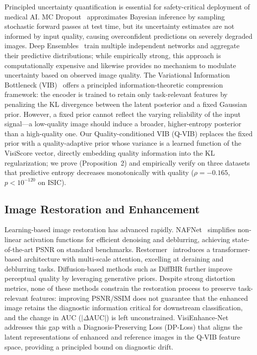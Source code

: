 Principled uncertainty quantification is essential for safety-critical deployment of medical AI.
MC Dropout~\cite{gal2016dropout} approximates Bayesian inference by sampling stochastic forward passes at test time, but its uncertainty estimates are not informed by input quality, causing overconfident predictions on severely degraded images.
Deep Ensembles~\cite{lakshminarayanan2017simple} train multiple independent networks and aggregate their predictive distributions; while empirically strong, this approach is computationally expensive and likewise provides no mechanism to modulate uncertainty based on observed image quality.
The Variational Information Bottleneck (VIB)~\cite{alemi2017deep} offers a principled information-theoretic compression framework: the encoder is trained to retain only task-relevant features by penalizing the KL divergence between the latent posterior and a fixed Gaussian prior.
However, a fixed prior cannot reflect the varying reliability of the input signal—a low-quality image should induce a broader, higher-entropy posterior than a high-quality one.
Our Quality-conditioned VIB (Q-VIB) replaces the fixed prior with a quality-adaptive prior whose variance is a learned function of the VisiScore vector, directly embedding quality information into the KL regularization; we prove (Proposition~2) and empirically verify on three datasets that predictive entropy decreases monotonically with quality ($\rho = -0.165$, $p < 10^{-120}$ on ISIC).

\subsection{Image Restoration and Enhancement}
\label{sec:related:enhancement}

Learning-based image restoration has advanced rapidly.
NAFNet~\cite{chen2022simple} simplifies non-linear activation functions for efficient denoising and deblurring, achieving state-of-the-art PSNR on standard benchmarks.
Restormer~\cite{zamir2022restormer} introduces a transformer-based architecture with multi-scale attention, excelling at deraining and deblurring tasks.
Diffusion-based methods such as DiffBIR further improve perceptual quality by leveraging generative priors.
Despite strong distortion metrics, none of these methods constrain the restoration process to preserve task-relevant features: improving PSNR/SSIM does not guarantee that the enhanced image retains the diagnostic information critical for downstream classification, and the change in AUC ($|\Delta\mathrm{AUC}|$) is left unconstrained.
VisiEnhance-Net addresses this gap with a Diagnosis-Preserving Loss (DP-Loss) that aligns the latent representations of enhanced and reference images in the Q-VIB feature space, providing a principled bound on diagnostic drift.

